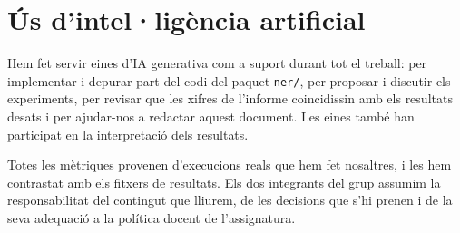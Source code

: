 \section{Ús d'intel·ligència artificial}
\label{sec:ia}

Hem fet servir eines d'IA generativa com a suport durant tot el treball: per implementar i depurar part del codi
del paquet \texttt{ner/}, per proposar i discutir els experiments, per revisar que les xifres de l'informe
coincidissin amb els resultats desats i per ajudar-nos a redactar aquest document. Les eines també han
participat en la interpretació dels resultats.

Totes les mètriques provenen d'execucions reals que hem fet nosaltres, i les hem contrastat amb els fitxers de
resultats. Els dos integrants del grup assumim la responsabilitat del contingut que lliurem, de les decisions que
s'hi prenen i de la seva adequació a la política docent de l'assignatura.
